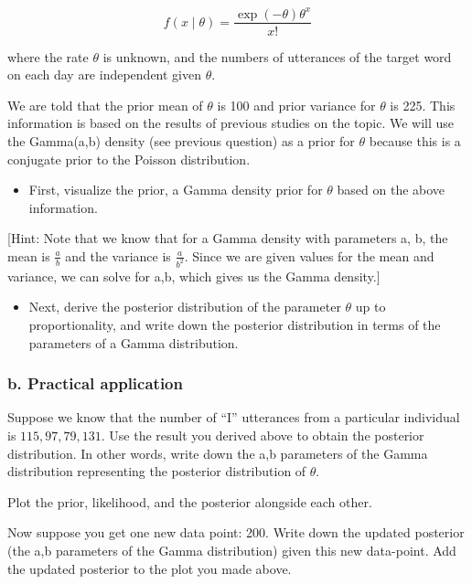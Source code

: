 \documentclass[12pt,]{krantz}
\providecommand{\tightlist}{%
  \setlength{\itemsep}{0pt}\setlength{\parskip}{0pt}}
\theoremstyle{definition}
\theoremstyle{definition}
\theoremstyle{definition}
\theoremstyle{remark}
\begin{document}
\begin{equation}
f(x\mid \theta) = \frac{\exp(-\theta) \theta^x}{x!}
\end{equation}

where the rate \(\theta\) is unknown, and the numbers of utterances of the target word on each day are independent given \(\theta\).

We are told that the prior mean of \(\theta\) is 100 and prior variance for \(\theta\) is 225. This information is based on the results of previous studies on the topic. We will use the Gamma(a,b) density (see previous question) as a prior for \(\theta\) because this is a conjugate prior to the Poisson distribution.

\begin{itemize}
\tightlist
\item
  First, visualize the prior, a Gamma density prior for \(\theta\) based on the above information.
\end{itemize}

{[}Hint: Note that we know that for a Gamma density with parameters a, b, the mean is \(\frac{a}{b}\) and the variance is \(\frac{a}{b^2}\). Since we are given values for the mean and variance, we can solve for a,b, which gives us the Gamma density.{]}

\begin{itemize}
\tightlist
\item
  Next, derive the posterior distribution of the parameter \(\theta\) up to proportionality, and write down the posterior distribution in terms of the parameters of a Gamma distribution.
\end{itemize}

\hypertarget{b.-practical-application}{%
\subsubsection{b. Practical application}\label{b.-practical-application}}

Suppose we know that the number of ``I'' utterances from a particular individual is \(115, 97, 79, 131\). Use the result you derived above to obtain the posterior distribution. In other words, write down the a,b parameters of the Gamma distribution representing the posterior distribution of \(\theta\).

Plot the prior, likelihood, and the posterior alongside each other.

Now suppose you get one new data point: 200. Write down the updated posterior (the a,b parameters of the Gamma distribution) given this new data-point. Add the updated posterior to the plot you made above.
\end{document}
